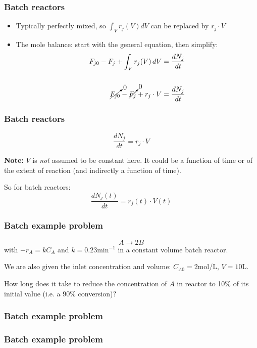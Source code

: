 \begin{frame}\frametitle{Batch reactors}
	\begin{itemize}
		\item	Typically perfectly mixed, so $\displaystyle \int_V r_j(V)dV$ can be replaced by $r_j \cdot V$
		\item	The mole balance: start with the general equation, then simplify:
		\[
			\begin{aligned}
				F_{j0} - F_j + \int_V r_j(V) \,dV &= \frac{dN_j}{dt}\\
				\\
				\cancelto{0}{F_{j0}} - \cancelto{0}{F_j} + r_j \cdot V        &= \frac{dN_j}{dt}\\
			\end{aligned}
		\]
	\end{itemize}
\end{frame}

\begin{frame}\frametitle{Batch reactors}
	$$\frac{dN_j}{dt} = r_j \cdot V$$ 
	
	\textbf{Note:} $V$ is \emph{not} assumed to be constant here. It could be a function of time or of the extent of reaction (and indirectly a function of time).
	\vspace{12pt}
	\begin{exampleblock}{So for batch reactors:}
		$$\frac{dN_j(t)}{dt} = r_j(t) \cdot V(t)$$
	\end{exampleblock}
\end{frame}

\begin{frame}\frametitle{Batch example problem}
	$$A\longrightarrow2B$$
	with $-r_A = kC_A$ and $k = 0.23\text{min}^{-1}$ in a constant volume batch reactor.

	\vspace{12pt}
	We are also given the inlet concentration and volume: 
	$C_{A0} = 2$mol/L, $V=10$L. 
	
	\vspace{12pt}
	How long does it take to reduce the concentration of $A$ in reactor to 10\% of its initial value (i.e. a 90\% conversion)? 
\end{frame}

\begin{frame}\frametitle{Batch example problem}
	
\end{frame}

\begin{frame}\frametitle{Batch example problem}
	
\end{frame}

